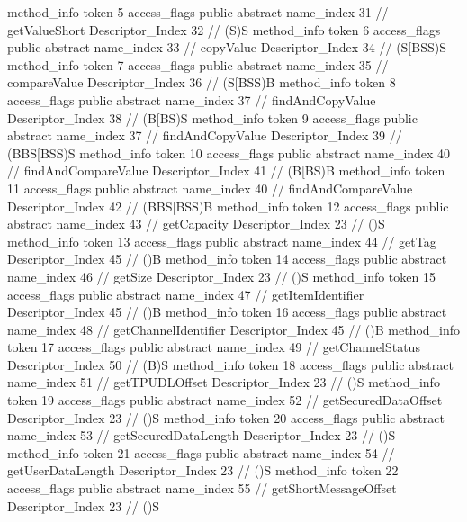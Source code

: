 {{{{{				}
				method_info {
					token	5
					access_flags	public abstract
					name_index	31		// getValueShort
					Descriptor_Index	32		// (S)S
				}
				method_info {
					token	6
					access_flags	public abstract
					name_index	33		// copyValue
					Descriptor_Index	34		// (S[BSS)S
				}
				method_info {
					token	7
					access_flags	public abstract
					name_index	35		// compareValue
					Descriptor_Index	36		// (S[BSS)B
				}
				method_info {
					token	8
					access_flags	public abstract
					name_index	37		// findAndCopyValue
					Descriptor_Index	38		// (B[BS)S
				}
				method_info {
					token	9
					access_flags	public abstract
					name_index	37		// findAndCopyValue
					Descriptor_Index	39		// (BBS[BSS)S
				}
				method_info {
					token	10
					access_flags	public abstract
					name_index	40		// findAndCompareValue
					Descriptor_Index	41		// (B[BS)B
				}
				method_info {
					token	11
					access_flags	public abstract
					name_index	40		// findAndCompareValue
					Descriptor_Index	42		// (BBS[BSS)B
				}
				method_info {
					token	12
					access_flags	public abstract
					name_index	43		// getCapacity
					Descriptor_Index	23		// ()S
				}
				method_info {
					token	13
					access_flags	public abstract
					name_index	44		// getTag
					Descriptor_Index	45		// ()B
				}
				method_info {
					token	14
					access_flags	public abstract
					name_index	46		// getSize
					Descriptor_Index	23		// ()S
				}
				method_info {
					token	15
					access_flags	public abstract
					name_index	47		// getItemIdentifier
					Descriptor_Index	45		// ()B
				}
				method_info {
					token	16
					access_flags	public abstract
					name_index	48		// getChannelIdentifier
					Descriptor_Index	45		// ()B
				}
				method_info {
					token	17
					access_flags	public abstract
					name_index	49		// getChannelStatus
					Descriptor_Index	50		// (B)S
				}
				method_info {
					token	18
					access_flags	public abstract
					name_index	51		// getTPUDLOffset
					Descriptor_Index	23		// ()S
				}
				method_info {
					token	19
					access_flags	public abstract
					name_index	52		// getSecuredDataOffset
					Descriptor_Index	23		// ()S
				}
				method_info {
					token	20
					access_flags	public abstract
					name_index	53		// getSecuredDataLength
					Descriptor_Index	23		// ()S
				}
				method_info {
					token	21
					access_flags	public abstract
					name_index	54		// getUserDataLength
					Descriptor_Index	23		// ()S
				}
				method_info {
					token	22
					access_flags	public abstract
					name_index	55		// getShortMessageOffset
					Descriptor_Index	23		// ()S
}}}}}
